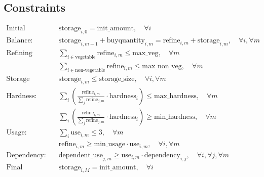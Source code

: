 \documentclass{article}
\begin{document}
\subsection*{Constraints}
\begin{align*}
\text{Initial Storage:} & \quad \text{storage}_{i, 0} = \text{init\_amount}, \quad \forall i \\
\text{Balance:} & \quad \text{storage}_{i, m-1} + \text{buyquantity}_{i, m} = \text{refine}_{i, m} + \text{storage}_{i, m}, \quad \forall i, \forall m \\
\text{Refining Capacity:} & \quad \sum_{i \in \text{vegetable}} \text{refine}_{i, m} \leq \text{max\_veg}, \quad \forall m \\
& \quad \sum_{i \in \text{non-vegetable}} \text{refine}_{i, m} \leq \text{max\_non\_veg}, \quad \forall m \\
\text{Storage Capacity:} & \quad \text{storage}_{i, m} \leq \text{storage\_size}, \quad \forall i, \forall m \\
\text{Hardness:} & \quad \sum_{i} \left( \frac{\text{refine}_{i, m}}{\sum_{j} \text{refine}_{j, m}} \cdot \text{hardness}_{i} \right) \leq \text{max\_hardness}, \quad \forall m \\
& \quad \sum_{i} \left( \frac{\text{refine}_{i, m}}{\sum_{j} \text{refine}_{j, m}} \cdot \text{hardness}_{i} \right) \geq \text{min\_hardness}, \quad \forall m \\
\text{Usage:} & \quad \sum_{i} \text{use}_{i, m} \leq 3, \quad \forall m \\
& \quad \text{refine}_{i, m} \geq \text{min\_usage} \cdot \text{use}_{i, m}, \quad \forall i, \forall m \\
\text{Dependency:} & \quad \text{dependent\_use}_{j, m} \geq \text{use}_{i, m} \cdot \text{dependency}_{i, j}, \quad \forall i, \forall j, \forall m \\
\text{Final Storage:} & \quad \text{storage}_{i, M} = \text{init\_amount}, \quad \forall i
\end{align*}
\end{document}

